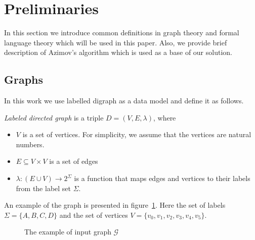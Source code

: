 \section{Preliminaries}

In this section we introduce common definitions in graph theory and formal language theory which will be used in this paper. 
Also, we provide brief description of Azimov's algorithm which is used as a base of our solution.

\subsection{Graphs}

In this work we use labelled digraph as a data model and define it as follows.
\begin{definition} \emph{Labeled directed graph} is a triple $D = (V, E, \lambda)$, where
\begin{itemize}
    \item $V$ is a set of vertices. For simplicity, we assume that the vertices are natural numbers.
    \item $E \subseteq V \times V$ is a set of edges
    \item $\lambda : (E\cup V) \xrightarrow{} 2^\Sigma$ is a function that maps edges and vertices to their labels from the label set $\Sigma$.
\end{itemize}
\end{definition}

An example of the graph is presented in figure~\ref{fig:example_input_graph}. Here the set of labels $\Sigma = \{A, B, C, D\}$ and the set of vertices $V = \{v_0, v_1, v_2, v_3, v_4, v_5\}$.

\begin{figure}[h]
    \centering        
    \caption{The example of input graph $\mathcal{G}$}
    \label{fig:example_input_graph}
\end{figure}

